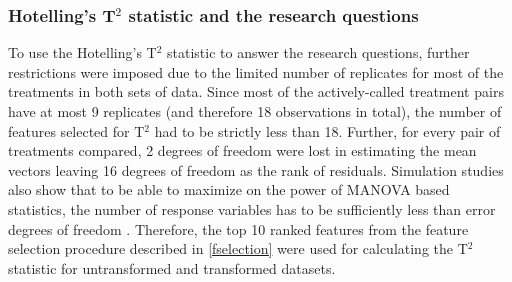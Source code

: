\documentclass[11pt]{article}
\begin{document}
\subsubsection*{Hotelling's T$^2$ statistic and the research questions}
\par{To use the Hotelling's  T$^2$ statistic to answer the research questions, further restrictions were imposed due to the limited number of replicates for most of the treatments in both sets of data. Since most of the actively-called treatment pairs have at most 9 replicates (and therefore 18 observations in total), the number of features selected for T$^2$ had to be strictly less than 18. Further, for every pair of treatments compared, 2 degrees of freedom were lost in estimating the mean vectors leaving 16 degrees of freedom as the rank of residuals. Simulation studies also show that to be able to maximize on the power of MANOVA based statistics, the number of response variables has to be sufficiently less than error degrees of freedom \cite{Preacher2002,Chi2013}. Therefore, the top 10 ranked features from the feature selection procedure described in \ref{fselection} were used for calculating the T$^2$ statistic for untransformed and transformed datasets.}
\end{document}
